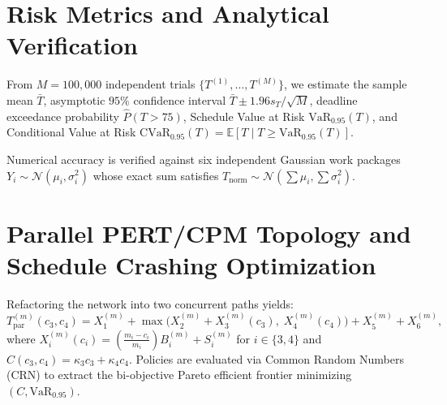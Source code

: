 \documentclass[11pt,a4paper]{article}
\newcommand{\E}{\mathbb{E}}
\begin{document}
\section{Risk Metrics and Analytical Verification}
From $M = 100{,}000$ independent trials $\{T^{(1)}, \dots, T^{(M)}\}$, we estimate the sample mean $\bar{T}$, asymptotic $95\%$ confidence interval $\bar{T} \pm 1.96 s_T / \sqrt{M}$, deadline exceedance probability $\hat{P}(T > 75)$, Schedule Value at Risk $\mathrm{VaR}_{0.95}(T)$, and Conditional Value at Risk $\mathrm{CVaR}_{0.95}(T) = \E[T \mid T \ge \mathrm{VaR}_{0.95}(T)]$.

Numerical accuracy is verified against six independent Gaussian work packages $Y_i \sim \mathcal{N}(\mu_i, \sigma_i^2)$ whose exact sum satisfies $T_{\mathrm{norm}} \sim \mathcal{N}\!\left(\sum \mu_i, \sum \sigma_i^2\right)$.

\section{Parallel PERT/CPM Topology and Schedule Crashing Optimization}
Refactoring the network into two concurrent paths yields:
\begin{equation}
    T_{\mathrm{par}}^{(m)}(c_3, c_4) = X_1^{(m)} + \max\!\Big(X_2^{(m)} + X_3^{(m)}(c_3), \; X_4^{(m)}(c_4)\Big) + X_5^{(m)} + X_6^{(m)},
\end{equation}
where $X_i^{(m)}(c_i) = \left(\frac{m_i - c_i}{m_i}\right) B_i^{(m)} + S_i^{(m)}$ for $i \in \{3, 4\}$ and $C(c_3, c_4) = \kappa_3 c_3 + \kappa_4 c_4$. Policies are evaluated via Common Random Numbers (CRN) to extract the bi-objective Pareto efficient frontier minimizing $(C, \mathrm{VaR}_{0.95})$.
\end{document}
